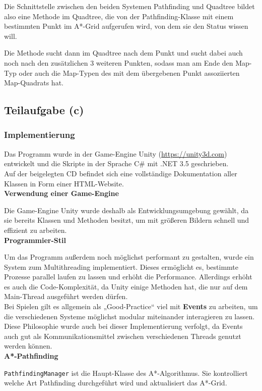 \documentclass[a4paper,12pt]{article}
\newcommand{\code}{\texttt}
\begin{document}
Die Schnittstelle zwischen den beiden Systemen Pathfinding und Quadtree bildet also eine Methode im Quadtree, die von der Pathfinding-Klasse mit einem bestimmten Punkt im A*-Grid aufgerufen wird, von dem sie den Status wissen will.

Die Methode sucht dann im Quadtree nach dem Punkt und sucht dabei auch noch nach den zusätzlichen 3 weiteren Punkten, sodass man am Ende den Map-Typ oder auch die Map-Typen des mit dem übergebenen Punkt assoziierten Map-Quadrats hat.

\subsection{Teilaufgabe (c)}
\subsubsection{Implementierung}
Das Programm wurde in der Game-Engine Unity (\url{https://unity3d.com}) entwickelt und die Skripte in der Sprache C\# mit .NET 3.5 geschrieben.
\\[0.4cm]
Auf der beigelegten CD befindet sich eine vollständige Dokumentation aller Klassen in Form einer HTML-Website.
\\[0.4cm]
\textbf{Verwendung einer Game-Engine}

Die Game-Engine Unity wurde deshalb als Entwicklungsumgebung gewählt, da sie bereits Klassen und Methoden besitzt, um mit größeren Bildern schnell und effizient zu arbeiten.
\\[0.4cm]
\textbf{Programmier-Stil}

Um das Programm außerdem noch möglichst performant zu gestalten, wurde ein System zum Multithreading \cite{csharp6} implementiert. Dieses ermöglicht es, bestimmte Prozesse parallel laufen zu lassen und erhöht die Performance. Allerdings erhöht es auch die Code-Komplexität, da Unity einige Methoden hat, die nur auf dem Main-Thread ausgeführt werden dürfen.
\\[0.4cm]
Bei Spielen gilt es allgemein als „Good-Practice“ viel mit \textbf{Events} \cite{csharp6} zu arbeiten, um die verschiedenen Systeme möglichst modular miteinander interagieren zu lassen. Diese Philosophie wurde auch bei dieser Implementierung verfolgt, da Events auch gut als Kommunikationsmittel zwischen verschiedenen Threads genutzt werden können.
\\[0.4cm]
\textbf{A*-Pathfinding}

\code{PathfindingManager} ist die Haupt-Klasse des A*-Algorithmus. Sie kontrolliert welche Art Pathfinding durchgeführt wird und aktualisiert das A*-Grid.
\end{document}
